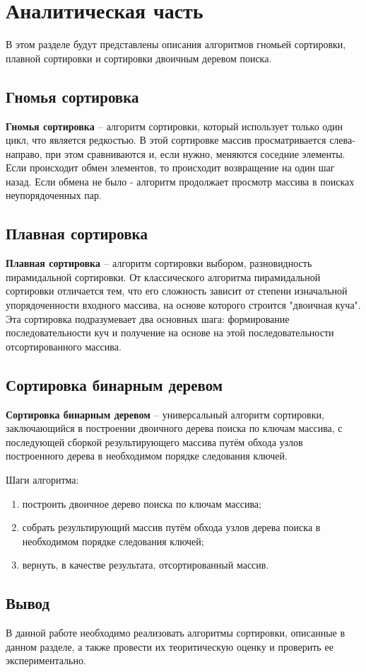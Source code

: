 \chapter{Аналитическая часть}
В этом разделе будут представлены описания алгоритмов гномьей сортировки, плавной сортировки и сортировки двоичным деревом поиска.

\section{Гномья сортировка}

\textbf{Гномья сортировка \cite{Knut}} --  алгоритм сортировки, который использует только один цикл, что является редкостью. В этой сортировке массив просматривается слева-направо, при этом сравниваются и, если нужно, меняются соседние элементы. Если происходит обмен элементов, то происходит возвращение на один шаг назад. Если обмена не было - алгоритм продолжает просмотр массива в поисках неупорядоченных пар.


\section{Плавная сортировка}

\textbf{Плавная сортировка \cite{Knut}} -- алгоритм сортировки выбором, разновидность пирамидальной сортировки. От классического алгоритма пирамидальной сортировки отличается тем, что его сложность зависит от степени изначальной упорядоченности входного массива, на основе которого строится "двоичная куча". Эта сортировка подразумевает два основных шага: формирование последовательности куч и получение на основе на этой последовательности отсортированного массива.

\section{Сортировка бинарным деревом}

\textbf{Сортировка бинарным деревом \cite{Knut}} -- универсальный алгоритм сортировки, заключающийся в построении двоичного дерева поиска по ключам массива, с последующей сборкой результирующего массива путём обхода узлов построенного дерева в необходимом порядке следования ключей.

\newpage
Шаги алгоритма:
\begin{enumerate}[label=\arabic*)]
	\item построить двоичное дерево поиска по ключам массива;
	\item собрать результирующий массив путём обхода узлов дерева поиска в необходимом порядке следования ключей;
	\item вернуть, в качестве результата, отсортированный массив.
\end{enumerate}

\section*{Вывод}

В данной работе необходимо реализовать алгоритмы сортировки, описанные в данном разделе, а также провести их теоритическую оценку и проверить ее экспериментально.




